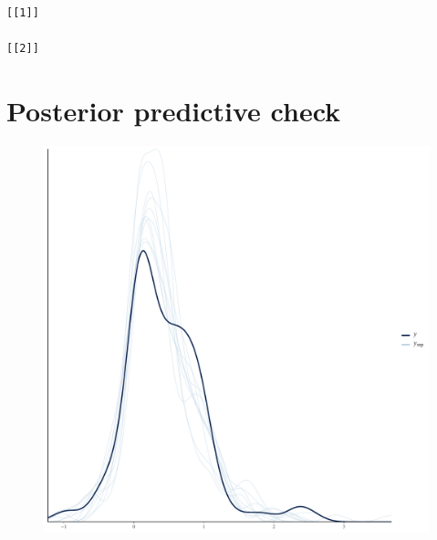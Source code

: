 \documentclass[
]{report}
\begin{document}
\begin{verbatim}
[[1]]

[[2]]
\end{verbatim}

\hypertarget{posterior-predictive-check-9}{%
\section{Posterior predictive
check}\label{posterior-predictive-check-9}}

\begin{figure}

{\centering \includegraphics[width=1\textwidth,height=\textheight]{diagnostic_plots_files/figure-pdf/unnamed-chunk-30-1.pdf}

}

\end{figure}
\end{document}
